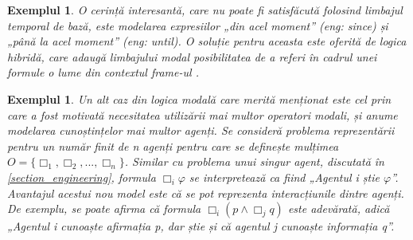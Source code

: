 \documentclass[12pt, openany]{book}
\newtheorem{example}[definition]{Exemplul} %
\newcommand{\mysectionreference}[1]{\autoref{#1}}
\newcommand{\myenglishterm}[1]{(\textit{eng: #1})}
\begin{document}
\begin{example}
                O cerință interesantă, care nu poate fi satisfăcută folosind limbajul temporal de bază, este modelarea 
                expresiilor „din acel moment” \myenglishterm{since} și „până la acel moment” \myenglishterm{until}. O 
                soluție pentru aceasta este oferită de logica hibridă, care adaugă limbajului modal posibilitatea de a 
                referi în cadrul unei formule o lume din contextul \textit{frame}-ul \cite{handbook_modal_logic}.
            \end{example}

            \begin{example}
                Un alt caz din logica modală care merită menționat este cel prin care a fost motivată necesitatea utilizării 
                mai multor operatori modali, și anume modelarea cunoștințelor mai multor agenți. Se consideră problema 
                reprezentării pentru un număr finit de n agenți pentru care se definește mulțimea $O=\{\Box_1, \Box_2, 
                ..., \Box_n\}$. Similar cu problema unui singur agent, discutată în 
                \mysectionreference{section_engineering}, formula $\Box_i \varphi$ se interpretează ca fiind „Agentul i 
                știe $\varphi$”. Avantajul acestui nou model este că se pot reprezenta interacțiunile dintre agenți. 
                De exemplu, se poate afirma că formula $\Box_i (p \wedge \Box_j q)$ este adevărată, adică „Agentul i 
                cunoaște afirmația p, dar știe și că agentul j cunoaște informația q”.
            \end{example}
\end{document}
